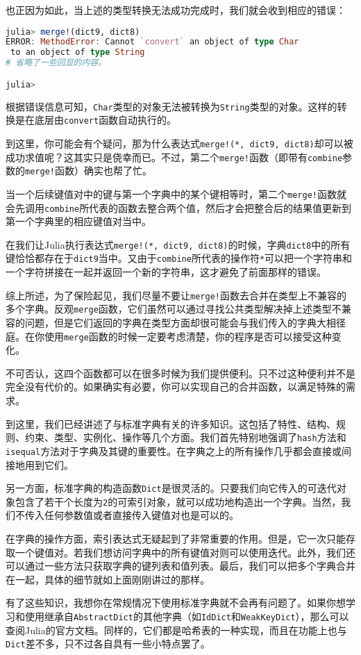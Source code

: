 也正因为如此，当上述的类型转换无法成功完成时，我们就会收到相应的错误：
\begin{lstlisting}[language=julia]
julia> merge!(dict9, dict8)
ERROR: MethodError: Cannot `convert` an object of type Char
 to an object of type String
# 省略了一些回显的内容。

julia> 
\end{lstlisting}

根据错误信息可知，\verb|Char|类型的对象无法被转换为\verb|String|类型的对象。这样的转换是在底层由\verb|convert|函数自动执行的。

到这里，你可能会有个疑问，那为什么表达式\verb|merge!(*, dict9, dict8)|却可以被成功求值呢？这其实只是侥幸而已。不过，第二个\verb|merge!|函数（即带有\verb|combine|参数的\verb|merge!|函数）确实也帮了忙。

当一个后续键值对中的键与第一个字典中的某个键相等时，第二个\verb|merge!|函数就会先调用\verb|combine|所代表的函数去整合两个值，然后才会把整合后的结果值更新到第一个字典里的相应键值对当中。

在我们让Julia执行表达式\verb|merge!(*, dict9, dict8)|的时候，字典\verb|dict8|中的所有键恰恰都存在于\verb|dict9|当中。又由于\verb|combine|所代表的操作符\verb|*|可以把一个字符串和一个字符拼接在一起并返回一个新的字符串，这才避免了前面那样的错误。

综上所述，为了保险起见，我们尽量不要让\verb|merge!|函数去合并在类型上不兼容的多个字典。反观\verb|merge|函数，它们虽然可以通过寻找公共类型解决掉上述类型不兼容的问题，但是它们返回的字典在类型方面却很可能会与我们传入的字典大相径庭。在你使用\verb|merge|函数的时候一定要考虑清楚，你的程序是否可以接受这种变化。

不可否认，这四个函数都可以在很多时候为我们提供便利。只不过这种便利并不是完全没有代价的。如果确实有必要，你可以实现自己的合并函数，以满足特殊的需求。

到这里，我们已经讲述了与标准字典有关的许多知识。这包括了特性、结构、规则、约束、类型、实例化、操作等几个方面。我们首先特别地强调了\verb|hash|方法和\verb|isequal|方法对于字典及其键的重要性。在字典之上的所有操作几乎都会直接或间接地用到它们。

另一方面，标准字典的构造函数\verb|Dict|是很灵活的。只要我们向它传入的可迭代对象包含了若干个长度为\verb|2|的可索引对象，就可以成功地构造出一个字典。当然，我们不传入任何参数值或者直接传入键值对也是可以的。

在字典的操作方面，索引表达式无疑起到了非常重要的作用。但是，它一次只能存取一个键值对。若我们想访问字典中的所有键值对则可以使用迭代。此外，我们还可以通过一些方法只获取字典的键列表和值列表。最后，我们可以把多个字典合并在一起，具体的细节就如上面刚刚讲过的那样。

有了这些知识，我想你在常规情况下使用标准字典就不会再有问题了。如果你想学习和使用继承自\verb|AbstractDict|的其他字典（如\verb|IdDict|和\verb|WeakKeyDict|），那么可以查阅Julia的官方文档。同样的，它们都是哈希表的一种实现，而且在功能上也与\verb|Dict|差不多，只不过各自具有一些小特点罢了。
